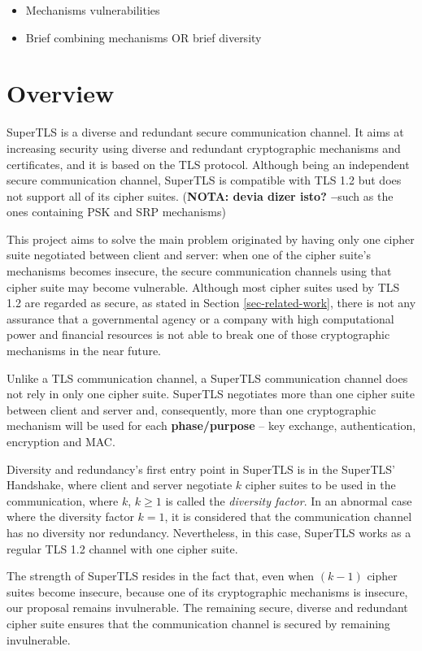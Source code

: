 \documentclass{sig-alternate-05-2015}
\begin{document}
\begin{itemize}
	\item{Mechanisms vulnerabilities}
	\item{Brief combining mechanisms OR brief diversity}
\end{itemize}

\section{Overview}

SuperTLS is a diverse and redundant secure communication channel. It aims at increasing security using diverse and redundant cryptographic mechanisms and certificates, and it is based on the TLS protocol. Although being an independent secure communication channel, SuperTLS is compatible with TLS 1.2 but does not support all of its cipher suites. (\textbf{NOTA: devia dizer isto? --}such as the ones containing PSK and SRP mechanisms)

This project aims to solve the main problem originated by having only one cipher suite negotiated between client and server: when one of the cipher suite's mechanisms becomes insecure, the secure communication channels using that cipher suite may become vulnerable.
Although most cipher suites used by TLS 1.2 are regarded as secure, as stated in Section \ref{sec-related-work}, there is not any assurance that a governmental agency or a company with high computational power and financial resources is not able to break one of those cryptographic mechanisms in the near future.

Unlike a TLS communication channel, a SuperTLS communication channel does not rely in only one cipher suite.
SuperTLS negotiates more than one cipher suite between client and server and, consequently, more than one cryptographic mechanism will be used for each \textbf{phase/purpose} -- key exchange, authentication, encryption and MAC.

Diversity and redundancy's first entry point in SuperTLS is in the SuperTLS' Handshake, where client and server negotiate $k$ cipher suites to be used in the communication, where $k$, $k\geq1$ is called the \textit{diversity factor}. In an abnormal case where the diversity factor $k = 1$, it is considered that the communication channel has no diversity nor redundancy. Nevertheless, in this case, SuperTLS works as a regular TLS 1.2 channel with one cipher suite.

The strength of SuperTLS resides in the fact that, even when $(k - 1)$ cipher suites become insecure, because one of its cryptographic mechanisms is insecure, our proposal remains invulnerable. The remaining secure, diverse and redundant cipher suite ensures that the communication channel is secured by remaining invulnerable.
\end{document}
